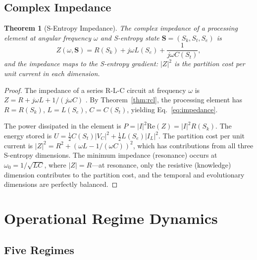 \documentclass[twocolumn,10pt]{article}
\newtheorem{theorem}{Theorem}[section]
\theoremstyle{remark}
\newcommand{\Sk}{S_k}
\newcommand{\St}{S_t}
\newcommand{\Se}{S_e}
\newcommand{\Scoord}{\mathbf{S}}
\begin{document}
\subsection{Complex Impedance}

\begin{theorem}[S-Entropy Impedance]
\label{thm:impedance}
The complex impedance of a processing element at angular frequency $\omega$ and S-entropy state $\Scoord = (\Sk, \St, \Se)$ is
\begin{equation}
Z(\omega, \Scoord) = R(\Sk) + j\omega L(\Se) + \frac{1}{j\omega C(\St)},
\label{eq:impedance}
\end{equation}
and the impedance maps to the S-entropy gradient: $|Z|^2$ is the partition cost per unit current in each dimension.
\end{theorem}

\begin{proof}
The impedance of a series R-L-C circuit at frequency $\omega$ is $Z = R + j\omega L + 1/(j\omega C)$ \cite{kirchhoff1845}. By Theorem~\ref{thm:rcl}, the processing element has $R = R(\Sk)$, $L = L(\Se)$, $C = C(\St)$, yielding Eq.~\eqref{eq:impedance}.

The power dissipated in the element is $P = |I|^2 \mathrm{Re}(Z) = |I|^2 R(\Sk)$. The energy stored is $U = \frac{1}{2}C(\St)|V_C|^2 + \frac{1}{2}L(\Se)|I_L|^2$. The partition cost per unit current is $|Z|^2 = R^2 + (\omega L - 1/(\omega C))^2$, which has contributions from all three S-entropy dimensions. The minimum impedance (resonance) occurs at $\omega_0 = 1/\sqrt{LC}$, where $|Z| = R$---at resonance, only the resistive (knowledge) dimension contributes to the partition cost, and the temporal and evolutionary dimensions are perfectly balanced.
\end{proof}

\section{Operational Regime Dynamics}
\label{sec:regimes}

\subsection{Five Regimes}
\end{document}
